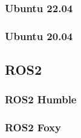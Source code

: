 \setcounter{footnote}{46} %

\subsubsection{Ubuntu 22.04}

\subsubsection{Ubuntu 20.04}


\subsection{ROS2}


\subsubsection{ROS2 Humble}

\subsubsection{ROS2 Foxy}


